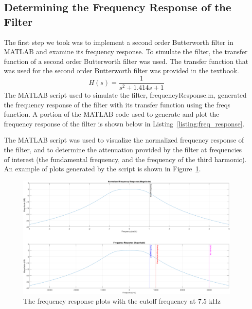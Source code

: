 \documentclass[12pt]{article}
\begin{document}
\subsection*{Determining the Frequency Response of the Filter}
The first step we took was to implement a second order Butterworth filter in MATLAB and examine its frequency response. To simulate the filter, the transfer function of a second order Butterworth filter was used. The transfer function that was used for the second order Butterworth filter was provided in the textbook.
\begin{equation*}
    H(s) = \frac{1}{s^2 + 1.414s + 1}
\end{equation*}
The MATLAB script used to simulate the filter, frequencyResponse.m, generated the frequency response of the filter with its transfer function using the freqs function. A portion of the MATLAB code used to generate and plot the frequency response of the filter is shown below in Listing~\ref{listing:freq_response}.

The MATLAB script was used to visualize the normalized frequency response of the filter, and to determine the attenuation provided by the filter at frequencies of interest (the fundamental frequency, and the frequency of the third harmonic). An example of plots generated by the script is shown in Figure~\ref{fig:example_freq_response}.
\begin{figure}[h!]
    \includegraphics[width=\textwidth]{example_frequency_response.png}
    \caption{\label{fig:example_freq_response} The frequency response plots with the cutoff frequency at 7.5 kHz}
\end{figure}
\end{document}
